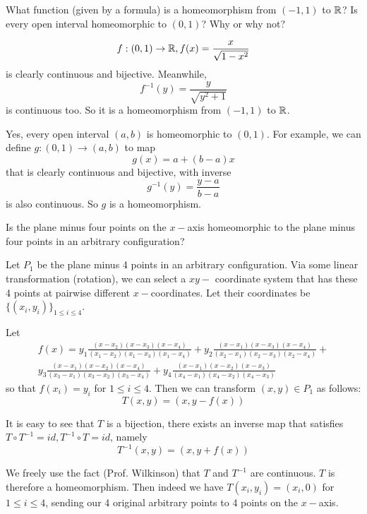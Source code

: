 \documentclass[a4paper, 11pt]{article}
\begin{document}
\begin{problem} [2.20]
What function (given by a formula) is a homeomorphism from $(-1, 1)$ to $\mathbb{R}$? Is every open interval homeomorphic to $(0, 1)$? Why or why not?
\end{problem}
\begin{solution}
    \[
    f: (0, 1) \to \mathbb{R}, f(x) = \frac{x}{\sqrt{1 - x^2}}
    \]
    is clearly continuous and bijective. Meanwhile,
    \[
        f^{-1}(y) = \frac{y}{\sqrt{y^2 + 1}}
    \]
    is continuous too. So it is a homeomorphism from $(-1, 1)$ to $\mathbb{R}$.

    Yes, every open interval $(a, b)$ is homeomorphic to $(0, 1)$. For example, we can define $g: (0, 1) \to (a, b)$ to map \[
        g(x) = a + (b-a)x
    \]
    that is clearly continuous and bijective, with inverse \[
        g^{-1}(y) = \frac{y-a}{b - a}
    \]
    is also continuous. So $g$ is a homeomorphism.
\end{solution}

\begin{problem} [2.21]
Is the plane minus four points on the $x-$axis homeomorphic to the plane minus four points in an arbitrary configuration?
\end{problem}
\begin{solution}
    Let $P_1$ be the plane minus 4 points in an arbitrary configuration. Via some linear transformation (rotation), we can select a $xy-$ coordinate system that has these 4 points at pairwise different $x-$coordinates. Let their coordinates be $\{(x_i, y_i)\}_{1 \leq i \leq 4}$.

    Let 
    \begin{multline*}
        f(x) = y_1 \frac{(x-x_2)(x-x_3)(x-x_4)}{(x_1 - x_2)(x_1 - x_3)(x_1 - x_4)} + y_2 \frac{(x-x_1)(x-x_3)(x-x_4)}{(x_2 - x_1)(x_2 - x_3)(x_2 - x_4)} + \\
        y_3 \frac{(x-x_1)(x-x_2)(x-x_4)}{(x_3 - x_1)(x_3 - x_2)(x_3 - x_4)} + y_4 \frac{(x-x_1)(x-x_2)(x-x_3)}{(x_4 - x_1)(x_4 - x_2)(x_4 - x_3)}
    \end{multline*} 
    so that $f(x_i) = y_i$ for $1 \leq i \leq 4$. Then we can transform $(x, y) \in P_1$ as follows:
    \[
    T(x, y) = (x, y - f(x))
    \]

    It is easy to see that $T$ is a bijection, there exists an inverse map that satisfies $T \circ T^{-1} = id, T^{-1} \circ T = id$, namely \[
    T^{-1} (x, y) = (x , y + f(x))
    \]

     We freely use the fact (Prof. Wilkinson) that $T$ and $T^{-1}$ are continuous. $T$ is therefore a homeomorphism. Then indeed we have $T(x_i, y_i) = (x_i, 0)$ for $ 1\leq i \leq 4$, sending our 4 original arbitrary points to 4 points on the $x-$axis.
\end{solution}
\end{document}
